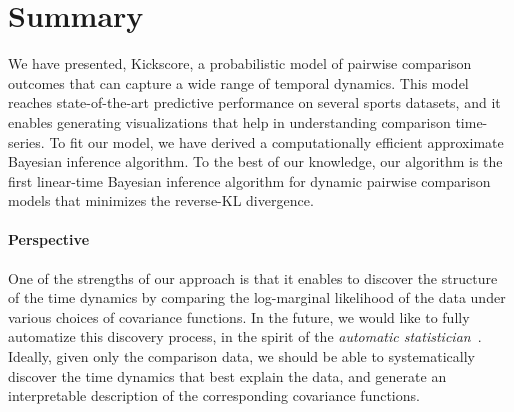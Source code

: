 \section{Summary}
\label{kks:sec:summary}

We have presented, Kickscore, a probabilistic model of pairwise comparison outcomes that can capture a wide range of temporal dynamics.
This model reaches state-of-the-art predictive performance on several sports datasets, and it enables generating visualizations that help in understanding comparison time-series.
To fit our model, we have derived a computationally efficient approximate Bayesian inference algorithm.
To the best of our knowledge, our algorithm is the first linear-time Bayesian inference algorithm for dynamic pairwise comparison models that minimizes the reverse-KL divergence.

\paragraph{Perspective}
One of the strengths of our approach is that it enables to discover the structure of the time dynamics by comparing the log-marginal likelihood of the data under various choices of covariance functions.
In the future, we would like to fully automatize this discovery process, in the spirit of the \emph{automatic statistician}~\citep{duvenaud2014automatic}.
Ideally, given only the comparison data, we should be able to systematically discover the time dynamics that best explain the data, and generate an interpretable description of the corresponding covariance functions.
